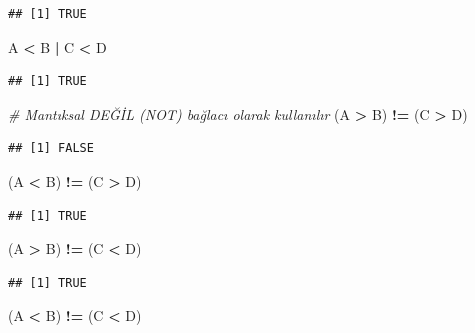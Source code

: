\documentclass[
]{book}
\newenvironment{Shaded}{\begin{snugshade}}{\end{snugshade}}
\newcommand{\CommentTok}[1]{\textcolor[rgb]{0.56,0.35,0.01}{\textit{#1}}}
\newcommand{\NormalTok}[1]{#1}
\newcommand{\SpecialCharTok}[1]{\textcolor[rgb]{0.81,0.36,0.00}{\textbf{#1}}}
\begin{document}
\begin{verbatim}
## [1] TRUE
\end{verbatim}

\begin{Shaded}
\begin{Highlighting}[]
\NormalTok{A }\SpecialCharTok{\textless{}}\NormalTok{ B }\SpecialCharTok{|}\NormalTok{ C }\SpecialCharTok{\textless{}}\NormalTok{ D}
\end{Highlighting}
\end{Shaded}

\begin{verbatim}
## [1] TRUE
\end{verbatim}

\begin{Shaded}
\begin{Highlighting}[]
\CommentTok{\# Mantıksal DEĞİL (NOT) bağlacı olarak kullanılır}
\NormalTok{(A }\SpecialCharTok{\textgreater{}}\NormalTok{ B) }\SpecialCharTok{!=}\NormalTok{ (C }\SpecialCharTok{\textgreater{}}\NormalTok{ D)}
\end{Highlighting}
\end{Shaded}

\begin{verbatim}
## [1] FALSE
\end{verbatim}

\begin{Shaded}
\begin{Highlighting}[]
\NormalTok{(A }\SpecialCharTok{\textless{}}\NormalTok{ B) }\SpecialCharTok{!=}\NormalTok{ (C }\SpecialCharTok{\textgreater{}}\NormalTok{ D)}
\end{Highlighting}
\end{Shaded}

\begin{verbatim}
## [1] TRUE
\end{verbatim}

\begin{Shaded}
\begin{Highlighting}[]
\NormalTok{(A }\SpecialCharTok{\textgreater{}}\NormalTok{ B) }\SpecialCharTok{!=}\NormalTok{ (C }\SpecialCharTok{\textless{}}\NormalTok{ D)}
\end{Highlighting}
\end{Shaded}

\begin{verbatim}
## [1] TRUE
\end{verbatim}

\begin{Shaded}
\begin{Highlighting}[]
\NormalTok{(A }\SpecialCharTok{\textless{}}\NormalTok{ B) }\SpecialCharTok{!=}\NormalTok{ (C }\SpecialCharTok{\textless{}}\NormalTok{ D)}
\end{Highlighting}
\end{Shaded}
\end{document}
